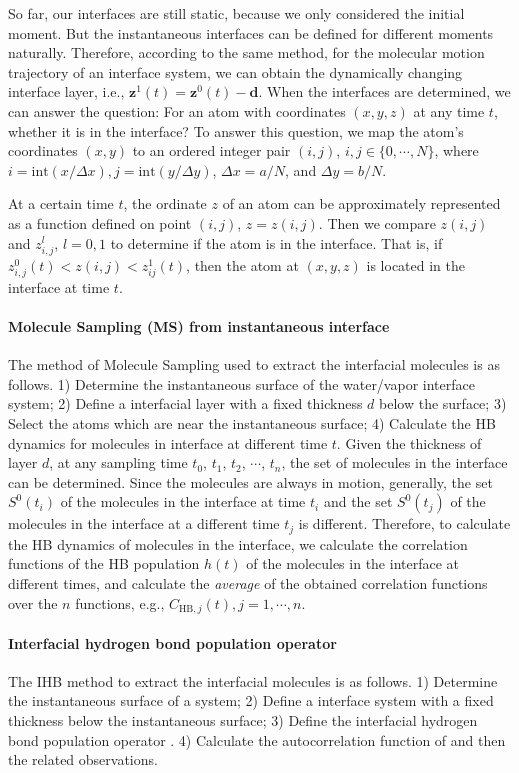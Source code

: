 So far, our interfaces are still static, because we only considered the initial moment. 
But the instantaneous interfaces can be defined for different moments naturally. 
Therefore, according to the same method, for the molecular motion trajectory of an interface system, 
we can obtain the dynamically changing interface layer, i.e., ${\mathbf z}^1(t)={\mathbf z}^0(t)-{\mathbf d}$. 
When the interfaces are determined, we can answer the question: For an atom with coordinates $(x, y, z)$ at any time $t$, whether it is in the interface?
To answer this question, we map the atom's coordinates $(x, y)$ to an ordered integer pair $(i, j)$, $i,j \in  \{0,\cdots,N\}$, 
where $i = \text{int}(x /\Delta x), j = \text{int}(y/\Delta y)$, $\Delta x = a/N$, and $\Delta y = b/N$.
 
At a certain time $t$, the ordinate $z$ of an atom can be approximately represented as a function defined on point $(i, j)$, $z=z(i,j)$. 
Then we compare $z(i,j)$ and $z^l_{i,j}$, $l=0,1$ to determine if the atom is in the interface. 
That is, if $z^0_{i,j}(t)<z(i,j)<z^1_{ij}(t)$, then the atom at $(x,y,z)$ is located in the interface at time $t$.

\paragraph{Molecule Sampling (MS) from instantaneous interface}\label{para_MS_interface}
The method of Molecule Sampling used to extract the interfacial molecules is as follows. 
1) Determine the instantaneous surface of the water/vapor interface system;
2) Define a interfacial layer with a fixed thickness $d$ below the surface; 
3) Select the atoms which are near the instantaneous surface;
4) Calculate the HB dynamics for molecules in interface at different time $t$.
Given the thickness of layer $d$, at any sampling time $t_0$, $t_1$, $t_2$, $\cdots$, $t_n$, the set of molecules in the interface can be determined. 
Since the molecules are always in motion, generally, the set $S^0(t_i)$ of the molecules in the interface at time $t_i$ 
and the set $S^0(t_j)$ of the molecules in the interface at a different time $t_j$ is different. 
Therefore, to calculate the HB dynamics of molecules in the interface, we calculate the correlation functions of 
the HB population $h(t)$ of the molecules in the interface at different times, 
and calculate the \emph{average} of the obtained correlation functions 
over the $n$ functions, e.g., $C_{\text{HB},j}(t), j=1,\cdots,n$.
 
\paragraph{Interfacial hydrogen bond population operator \hbos} 
The IHB method to extract the interfacial molecules is as follows. 
1) Determine the instantaneous surface of a system;
2) Define a interface system with a fixed thickness below the instantaneous surface; 
3) Define the interfacial hydrogen bond population operator \hbos.
4) Calculate the autocorrelation function of \hbos and then the related observations. 

